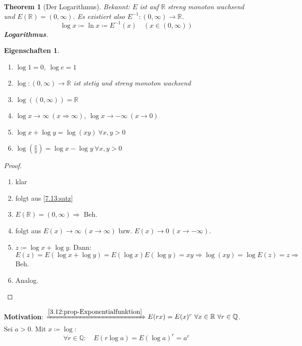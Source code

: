 \documentclass[14pt,titlepage,ngerman,a4paper,headsepline,DIV15,halfparskip*]{scrartcl}
\newcommand{\Q}{\mathbb{Q}}
\newcommand{\R}{\mathbb{R}}
\theoremstyle{named}
\newtheorem{namedtheorem}{Theorem} \counterwithin{namedtheorem}{section}
\theoremstyle{dotless}
\newtheorem*{eigenschaften}{Eigenschaften}
\begin{document}
\begin{namedtheorem}[Der Logarithmus] \label{7.14:prop-Logarithmus}
	Bekannt: $E$ ist auf $\R$ streng monoton wachsend und $E(\R) = (0, \infty)$. Es existiert also $E^{-1} \colon (0, \infty) \rightarrow \R$.
		$$ \log x \coloneqq \ln x \coloneqq E^{-1}(x) \quad (x \in (0, \infty)) $$
	\textbf{Logarithmus}.
\end{namedtheorem}


\begin{eigenschaften} ~\
	\begin{enumerate}
		\item $\log 1 = 0$, $\log e = 1$
		\item $\log \colon (0, \infty) \rightarrow \R$ ist stetig und streng monoton wachsend
		\item $\log \left( (0, \infty) \right) = \R$
		\item $\log x \rightarrow \infty ~(x \Rightarrow \infty)$, $\log x \rightarrow -\infty ~(x \rightarrow 0)$
		\item $\log x + \log y = \log(xy) ~\forall x, y > 0$
		\item $\log\left(\frac{x}{y}\right) = \log x - \log y ~\forall x, y > 0$
	\end{enumerate}	
\end{eigenschaften}

\begin{proof} ~\
	\begin{enumerate}
		\item klar
		\item folgt aus \ref{7.13:satz}
		\item $E(\R) = (0, \infty) \Rightarrow$ Beh.
		\item folgt aus $E(x) \rightarrow \infty ~(x \rightarrow \infty)$ bzw. $E(x) \rightarrow 0 ~(x \rightarrow -\infty)$.
		\item $z \coloneqq \log x + \log y$. Dann: $E(z) =E(\log x + \log y) = E(\log x) E(\log y) = x y \Rightarrow \log(xy) = \log E(z) = z \Rightarrow$ Beh.
		\item Analog.
	\end{enumerate}
\end{proof}


\textbf{Motivation}: $\xRightarrow[]{\ref{3.12:prop-Exponentialfunktion}} E(rx) = E(x)^{r} ~\forall x \in \R ~\forall r \in \Q$. \\
	Sei $a > 0$. Mit $x \coloneqq \log$:
		$$ \forall r \in \Q: \quad E(r \log a) = E(\log a)^{r} = a^{r} $$
\end{document}
